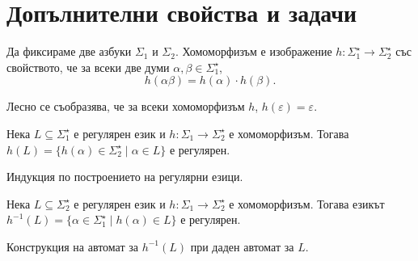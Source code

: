 \section{Допълнителни свойства и задачи}

\begin{dfn}
  Да фиксираме две азбуки $\Sigma_1$ и $\Sigma_2$.
  Хомоморфизъм е изображение $h:\Sigma^\star_1 \to \Sigma^\star_2$ със свойството, че
  за всеки две думи $\alpha,\beta\in\Sigma^\star_1$,
  \[h(\alpha\beta) = h(\alpha)\cdot h(\beta).\]
\end{dfn}

Лесно се съобразява, че за всеки хомоморфизъм $h$, $h(\varepsilon) = \varepsilon$.

\begin{problem}
  Нека $L \subseteq \Sigma^\star_1$ е регулярен език и $h:\Sigma_1\to\Sigma^\star_2$ е хомоморфизъм.
  Тогава 
  $h(L) = \{h(\alpha) \in \Sigma^\star_2 \mid \alpha \in L\}$ е регулярен.
\end{problem}
\begin{hint}
  Индукция по построението на регулярни езици.
\end{hint}

\begin{problem}
  Нека $L\subseteq \Sigma^\star_2$ е регулярен език и $h:\Sigma_1\to\Sigma^\star_2$ е хомоморфизъм.
  Тогава езикът
  $h^{-1}(L) = \{\alpha \in \Sigma^\star_1 \mid h(\alpha) \in L\}$ е регулярен.  
\end{problem}
\begin{hint}
  Конструкция на автомат за $h^{-1}(L)$ при даден автомат за $L$.
\end{hint}

